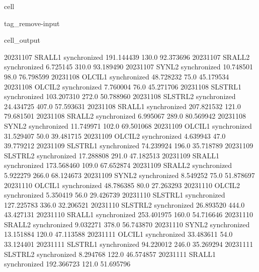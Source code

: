 \documentclass[letterpaper,10pt,english]{jupyterBook}
\begin{document}
\begin{sphinxuseclass}{cell}
\begin{sphinxuseclass}{tag_remove-input}
\begin{sphinxVerbatimOutput}
\begin{sphinxuseclass}{cell_output}
\begin{sphinxVerbatim}[commandchars=\\\{\}]
2023\PYGZhy{}11\PYGZhy{}07      SRAL\PYGZus{}L1  synchronized  191.144439   130.0   92.373696
2023\PYGZhy{}11\PYGZhy{}07      SRAL\PYGZus{}L2  synchronized    6.725145   310.0   93.189490
2023\PYGZhy{}11\PYGZhy{}07       SYN\PYGZus{}L2  synchronized   10.748501    98.0   76.798599
2023\PYGZhy{}11\PYGZhy{}08      OLCI\PYGZus{}L1  synchronized   48.728232    75.0   45.179534
2023\PYGZhy{}11\PYGZhy{}08      OLCI\PYGZus{}L2  synchronized    7.760004    76.0   45.271706
2023\PYGZhy{}11\PYGZhy{}08     SLSTR\PYGZus{}L1  synchronized  103.207310   272.0   50.788960
2023\PYGZhy{}11\PYGZhy{}08     SLSTR\PYGZus{}L2  synchronized   24.434725   407.0   57.593631
2023\PYGZhy{}11\PYGZhy{}08      SRAL\PYGZus{}L1  synchronized  207.821532   121.0   79.681501
2023\PYGZhy{}11\PYGZhy{}08      SRAL\PYGZus{}L2  synchronized    6.995067   289.0   80.569942
2023\PYGZhy{}11\PYGZhy{}08       SYN\PYGZus{}L2  synchronized   11.749971   102.0   69.501068
2023\PYGZhy{}11\PYGZhy{}09      OLCI\PYGZus{}L1  synchronized   31.529407    50.0   39.481715
2023\PYGZhy{}11\PYGZhy{}09      OLCI\PYGZus{}L2  synchronized    4.639943    47.0   39.779212
2023\PYGZhy{}11\PYGZhy{}09     SLSTR\PYGZus{}L1  synchronized   74.239924   196.0   35.718789
2023\PYGZhy{}11\PYGZhy{}09     SLSTR\PYGZus{}L2  synchronized   17.288808   291.0   47.182513
2023\PYGZhy{}11\PYGZhy{}09      SRAL\PYGZus{}L1  synchronized  173.568460   109.0   67.652874
2023\PYGZhy{}11\PYGZhy{}09      SRAL\PYGZus{}L2  synchronized    5.922279   266.0   68.124673
2023\PYGZhy{}11\PYGZhy{}09       SYN\PYGZus{}L2  synchronized    8.549252    75.0   51.878697
2023\PYGZhy{}11\PYGZhy{}10      OLCI\PYGZus{}L1  synchronized   48.786385    80.0   27.263293
2023\PYGZhy{}11\PYGZhy{}10      OLCI\PYGZus{}L2  synchronized    5.350419    56.0   29.426739
2023\PYGZhy{}11\PYGZhy{}10     SLSTR\PYGZus{}L1  synchronized  127.225783   336.0   32.206521
2023\PYGZhy{}11\PYGZhy{}10     SLSTR\PYGZus{}L2  synchronized   26.893520   444.0   43.427131
2023\PYGZhy{}11\PYGZhy{}10      SRAL\PYGZus{}L1  synchronized  253.401975   160.0   54.716646
2023\PYGZhy{}11\PYGZhy{}10      SRAL\PYGZus{}L2  synchronized    9.032271   378.0   56.743870
2023\PYGZhy{}11\PYGZhy{}10       SYN\PYGZus{}L2  synchronized   13.151884   120.0   47.113588
2023\PYGZhy{}11\PYGZhy{}11      OLCI\PYGZus{}L1  synchronized   33.483611    54.0   33.124401
2023\PYGZhy{}11\PYGZhy{}11     SLSTR\PYGZus{}L1  synchronized   94.220012   246.0   35.269294
2023\PYGZhy{}11\PYGZhy{}11     SLSTR\PYGZus{}L2  synchronized    8.294768   122.0   46.574857
2023\PYGZhy{}11\PYGZhy{}11      SRAL\PYGZus{}L1  synchronized  192.366723   121.0   51.695796

\end{sphinxVerbatim}
\end{sphinxuseclass}
\end{sphinxVerbatimOutput}
\end{sphinxuseclass}
\end{sphinxuseclass}
\end{document}
